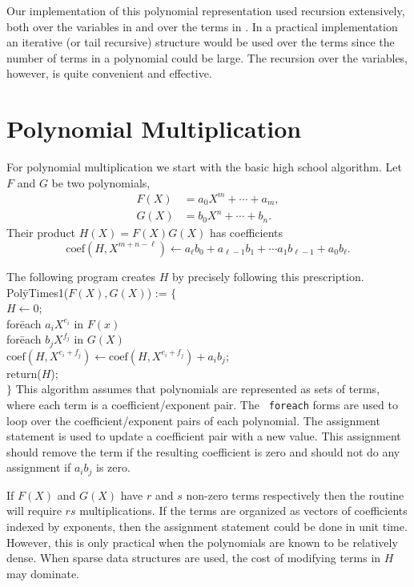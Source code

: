Our implementation of this polynomial representation used recursion
extensively, both over the variables in  and over the
terms in .  In a practical implementation an iterative
(or tail recursive) structure would be used over the terms since the
number of terms in a polynomial could be large.  The recursion over
the variables, however, is quite convenient and effective.

\section{Polynomial Multiplication}
\label{Poly:Mult:Sec}

For polynomial multiplication we start with the basic high school
algorithm.  Let $F$ and $G$ be two polynomials, 
\[
\begin{aligned}
F(X) &= a_{0} X^{m} + \cdots + a_{m}, \\
G(X) &= b_{0} X^{n} + \cdots + b_{n}.
\end{aligned}
\]
Their product $H(X) = F(X) G(X)$ has coefficients
\begin{equation} \label{PolyCauchyProduct:Eq}
\mbox{coef}(H, X^{m+n-\ell}) \leftarrow a_{\ell} b_{0} + a_{\ell-1} b_{1} + \cdots
 a_{1} b_{\ell-1} + a_{0} b_{\ell}.
\end{equation}

The following program creates $H$ by precisely following this prescription.
\begindsacode
Pol\=yTimes1($F(X), G(X)$) := $\{$\\
\> $H \leftarrow 0$; \\
\> for\=each $a_{i}X^{e_{i}}$ in $F(x)$ \\
\> \> for\=each $b_{j} X^{f_{j}}$ in $G(X)$ \\
\> \> \> $\mbox{coef}(H, X^{e_{i}+f_{j}}) \leftarrow
    \mbox{coef}(H, X^{e_{i}+f_{j}}) + a_{i} b_{j}$; \\
\> return($H$); \\
\> $\}$
\enddsacode
\label{PolyTimes1:Alg}
\noindent
This algorithm assumes that polynomials are represented as sets of
terms, where each term is a coefficient/exponent pair.  The {\tt
foreach} forms are used to loop over the coefficient/exponent pairs of
each polynomial.  The assignment statement is used to update a
coefficient pair with a new value.  This assignment should remove the
term if the resulting coefficient is zero and should not do any
assignment if $a_{i} b_{j}$ is zero.

If $F(X)$ and $G(X)$ have $r$ and $s$ non-zero terms respectively then
the routine  will require $rs$ multiplications.  If
the terms are organized as vectors of coefficients indexed by
exponents, then the assignment statement could be done in unit time.
However, this is only practical when the polynomials are known to be
relatively dense.  When sparse data structures are used, the cost of
modifying terms in $H$ may dominate.

